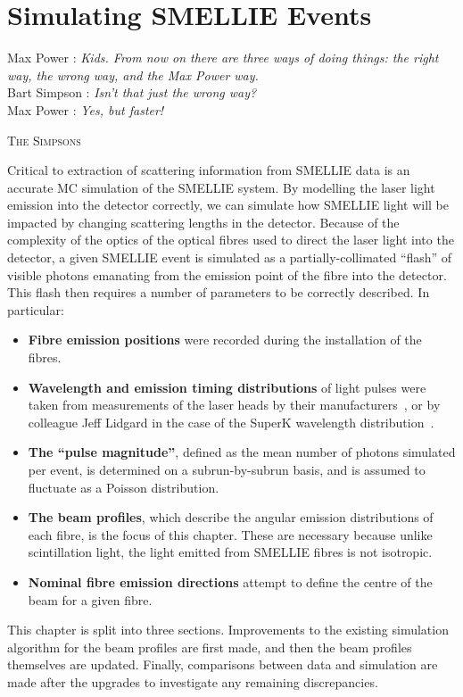 \chapter{Simulating SMELLIE Events}\label{chap:beam_profiling}
\setlength{\epigraphwidth}{.6\textwidth}
\epigraph{Max Power : \textit{Kids. From now on there are three ways of doing things: the right way, the wrong way, and the Max Power way.}\\
Bart Simpson : \textit{Isn't that just the wrong way?}\\
Max Power : \textit{Yes, but faster!}}{\textsc{The Simpsons}}
\setlength{\epigraphwidth}{.4\textwidth}
Critical to extraction of scattering information from SMELLIE data is an accurate MC simulation of the SMELLIE system. By modelling the laser light emission into the detector correctly, we can simulate how SMELLIE light will be impacted by changing scattering lengths in the detector. Because of the complexity of the optics of the optical fibres used to direct the laser light into the detector, a given SMELLIE event is simulated as a partially-collimated ``flash'' of visible photons emanating from the emission point of the fibre into the detector. This flash then requires a number of parameters to be correctly described. In particular:
\begin{itemize}
    \item \textbf{Fibre emission positions} were recorded during the installation of the fibres.
    \item \textbf{Wavelength and emission timing distributions} of light pulses were taken from measurements of the laser heads by their manufacturers~\cite{}, or by colleague Jeff Lidgard in the case of the SuperK wavelength distribution~\cite{}.
    \item \textbf{The ``pulse magnitude''}, defined as the mean number of photons simulated per event, is determined on a subrun-by-subrun basis, and is assumed to fluctuate as a Poisson distribution. 
    \item \textbf{The beam profiles}, which describe the angular emission distributions of each fibre, is the focus of this chapter. These are necessary because unlike scintillation light, the light emitted from SMELLIE fibres is not isotropic.
    \item \textbf{Nominal fibre emission directions} attempt to define the centre of the beam for a given fibre.
\end{itemize}

This chapter is split into three sections. Improvements to the existing simulation algorithm for the beam profiles are first made, and then the beam profiles themselves are updated. Finally, comparisons between data and simulation are made after the upgrades to investigate any remaining discrepancies.


